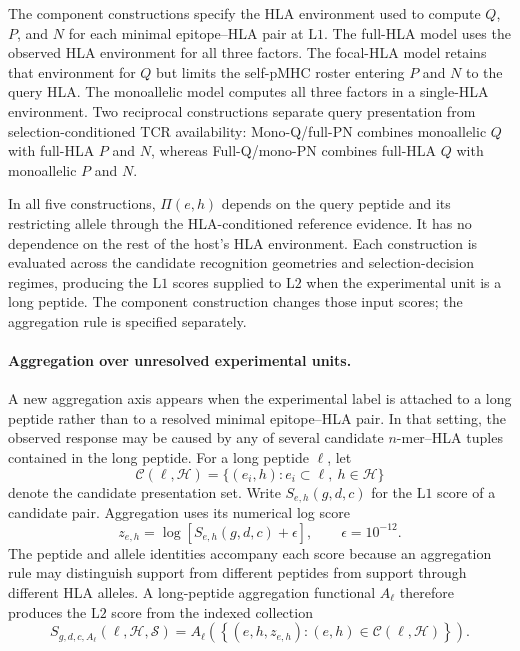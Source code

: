 \documentclass[11pt]{article}
\begin{document}
The component constructions specify the HLA environment used to compute
\(Q\), \(P\), and \(N\) for each minimal epitope--HLA pair at \(\mathrm{L1}\).
The full-HLA model uses the observed HLA environment for all three factors.
The focal-HLA model retains that environment for \(Q\) but limits the
self-pMHC roster entering \(P\) and \(N\) to the query HLA. The monoallelic
model computes all three factors in a single-HLA environment. Two reciprocal
constructions separate query presentation from selection-conditioned TCR
availability: Mono-Q/full-PN combines monoallelic \(Q\) with full-HLA \(P\)
and \(N\), whereas Full-Q/mono-PN combines full-HLA \(Q\) with monoallelic
\(P\) and \(N\).

In all five constructions, \(\Pi(e,h)\) depends on the query peptide and its
restricting allele through the HLA-conditioned reference evidence. It has no
dependence on the rest of the host's HLA environment. Each construction is
evaluated across the candidate recognition geometries and selection-decision
regimes, producing the \(\mathrm{L1}\) scores supplied to \(\mathrm{L2}\) when
the experimental unit is a long peptide. The component construction changes
those input scores; the aggregation rule is specified separately.

\paragraph{Aggregation over unresolved experimental units.}

A new aggregation axis appears when the experimental label is attached to a
long peptide rather than to a resolved minimal epitope--HLA pair. In that
setting, the observed response may be caused by any of several candidate
\(n\)-mer--HLA tuples contained in the long peptide. For a long peptide
\(\ell\), let
\[
\mathcal{C}(\ell,\mathcal{H})
=
\{(e_i,h): e_i \subset \ell,\ h\in\mathcal{H}\}
\]
denote the candidate presentation set. Write \(S_{e,h}(g,d,c)\) for the
\(\mathrm{L1}\) score of a candidate pair. Aggregation uses its numerical log
score
\[
z_{e,h}=\log\!\left[S_{e,h}(g,d,c)+\epsilon\right],
\qquad \epsilon=10^{-12}.
\]
The peptide and allele identities accompany each score because an aggregation
rule may distinguish support from different peptides from support through
different HLA alleles. A long-peptide aggregation functional \(A_{\ell}\)
therefore produces the \(\mathrm{L2}\) score from the indexed collection
\[
S_{g,d,c,A_{\ell}}(\ell,\mathcal{H},\mathcal{S})
=
A_{\ell}\!\left(
\left\{(e,h,z_{e,h}):(e,h)\in\mathcal{C}(\ell,\mathcal{H})\right\}
\right).
\]
\end{document}
